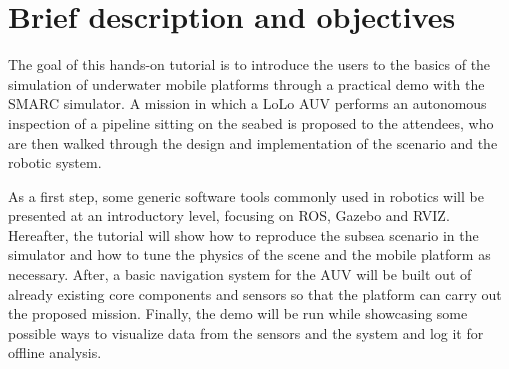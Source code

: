 \documentclass[
10pt, %
a4paper, %
oneside, %
BCOR5mm, %
]{scrartcl}
\begin{document}

\let\thefootnote\relax{}




 

\section{Brief description and objectives}
\label{sec:description}
The goal of this hands-on tutorial is to introduce the users to the basics of the simulation of underwater mobile platforms through a practical demo with the SMARC simulator.
A mission in which a LoLo AUV performs an autonomous inspection of a pipeline sitting on the seabed is proposed to the attendees, who are then walked through the design and implementation of the scenario and the robotic system.

As a first step, some generic software tools commonly used in robotics will be presented at an introductory level, focusing on ROS, Gazebo and RVIZ.
Hereafter, the tutorial will show how to reproduce the subsea scenario in the simulator and how to tune the physics of the scene and the mobile platform as necessary.
After, a basic navigation system for the AUV will be built out of already existing core components and sensors so that the platform can carry out the proposed mission.
Finally, the demo will be run while showcasing some possible ways to visualize data from the sensors and the system and log it for offline analysis.
\end{document}
